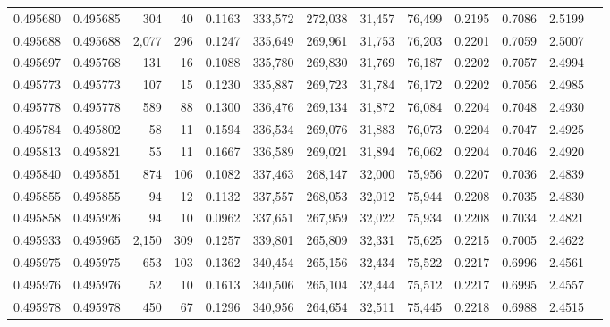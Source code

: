 \begin{tabular}{rrrrrrrrrrrrr}
0.495680 & 0.495685 &   304 &    40 &                                     0.1163 & 333,572 & 272,038 &  31,457 &  76,499 & 0.2195 & 0.7086 & 2.5199 \\
0.495688 & 0.495688 & 2,077 &   296 &                                     0.1247 & 335,649 & 269,961 &  31,753 &  76,203 & 0.2201 & 0.7059 & 2.5007 \\
0.495697 & 0.495768 &   131 &    16 &                                     0.1088 & 335,780 & 269,830 &  31,769 &  76,187 & 0.2202 & 0.7057 & 2.4994 \\
0.495773 & 0.495773 &   107 &    15 &                                     0.1230 & 335,887 & 269,723 &  31,784 &  76,172 & 0.2202 & 0.7056 & 2.4985 \\
0.495778 & 0.495778 &   589 &    88 &                                     0.1300 & 336,476 & 269,134 &  31,872 &  76,084 & 0.2204 & 0.7048 & 2.4930 \\
0.495784 & 0.495802 &    58 &    11 &                                     0.1594 & 336,534 & 269,076 &  31,883 &  76,073 & 0.2204 & 0.7047 & 2.4925 \\
0.495813 & 0.495821 &    55 &    11 &                                     0.1667 & 336,589 & 269,021 &  31,894 &  76,062 & 0.2204 & 0.7046 & 2.4920 \\
0.495840 & 0.495851 &   874 &   106 &                                     0.1082 & 337,463 & 268,147 &  32,000 &  75,956 & 0.2207 & 0.7036 & 2.4839 \\
0.495855 & 0.495855 &    94 &    12 &                                     0.1132 & 337,557 & 268,053 &  32,012 &  75,944 & 0.2208 & 0.7035 & 2.4830 \\
0.495858 & 0.495926 &    94 &    10 &                                     0.0962 & 337,651 & 267,959 &  32,022 &  75,934 & 0.2208 & 0.7034 & 2.4821 \\
0.495933 & 0.495965 & 2,150 &   309 &                                     0.1257 & 339,801 & 265,809 &  32,331 &  75,625 & 0.2215 & 0.7005 & 2.4622 \\
0.495975 & 0.495975 &   653 &   103 &                                     0.1362 & 340,454 & 265,156 &  32,434 &  75,522 & 0.2217 & 0.6996 & 2.4561 \\
0.495976 & 0.495976 &    52 &    10 &                                     0.1613 & 340,506 & 265,104 &  32,444 &  75,512 & 0.2217 & 0.6995 & 2.4557 \\
0.495978 & 0.495978 &   450 &    67 &                                     0.1296 & 340,956 & 264,654 &  32,511 &  75,445 & 0.2218 & 0.6988 & 2.4515 \\

\end{tabular}
